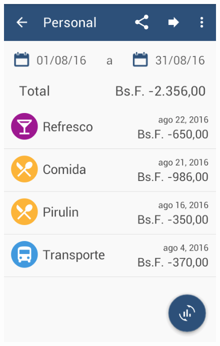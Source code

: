 \begin{figure}[ht]
\centering
\begin{minipage}{.5\textwidth}
  \centering
  \includegraphics[scale=0.45,type=png,ext=.png,read=.png]{imagenes/balance_report}
  \captionsetup{justification=centering}
  \label{fig:interfazBalanceReport}
\end{minipage}%
\begin{minipage}{.5\textwidth}
\centering

\end{minipage}
\end{figure}
